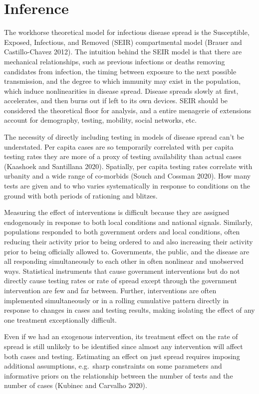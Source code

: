 \documentclass[
]{article}
\begin{document}
\hypertarget{inference}{%
\section{Inference}\label{inference}}

The workhorse theoretical model for infectious disease spread is the
Susceptible, Exposed, Infectious, and Removed (SEIR) compartmental model
(Brauer and Castillo-Chavez 2012). The intuition behind the SEIR model
is that there are mechanical relationships, such as previous infections
or deaths removing candidates from infection, the timing between
exposure to the next possible transmission, and the degree to which
immunity may exist in the population, which induce nonlinearities in
disease spread. Disease spreads slowly at first, accelerates, and then
burns out if left to its own devices. SEIR should be considered the
theoretical floor for analysis, and a entire menagerie of extensions
account for demography, testing, mobility, social networks, etc.

The necessity of directly including testing in models of disease spread
can't be understated. Per capita cases are so temporarily correlated
with per capita testing rates they are more of a proxy of testing
availability than actual cases (Kaashoek and Santillana 2020).
Spatially, per capita testing rates correlate with urbanity and a wide
range of co-morbids (Souch and Cossman 2020). How many tests are given
and to who varies systematically in response to conditions on the ground
with both periods of rationing and blitzes.

Measuring the effect of interventions is difficult because they are
assigned endogenously in response to both local conditions and national
signals. Similarly, populations responded to both government orders and
local conditions, often reducing their activity prior to being ordered
to and also increasing their activity prior to being officially allowed
to. Governments, the public, and the disease are all responding
simultaneously to each other in often nonlinear and unobserved ways.
Statistical instruments that cause government interventions but do not
directly cause testing rates or rate of spread except through the
government intervention are few and far between. Further, interventions
are often implemented simultaneously or in a rolling cumulative pattern
directly in response to changes in cases and testing results, making
isolating the effect of any one treatment exceptionally difficult.

Even if we had an exogenous intervention, its treatment effect on the
rate of spread is still unlikely to be identified since almost any
intervention will affect both cases and testing. Estimating an effect on
just spread requires imposing additional assumptions, e.g.~sharp
constraints on some parameters and informative priors on the
relationship between the number of tests and the number of cases
(Kubinec and Carvalho 2020).
\end{document}
